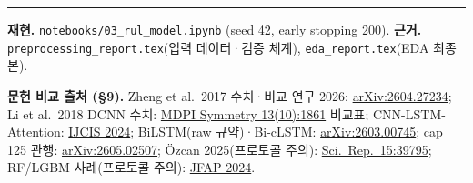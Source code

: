 \documentclass[11pt]{article}
\begin{document}
\vspace{1em}
\hrule
\vspace{0.6em}
\small
\textbf{재현.} \texttt{notebooks/03\_rul\_model.ipynb} (seed 42, early stopping 200).
\quad\textbf{근거.} \texttt{preprocessing\_report.tex}(입력 데이터·검증 체계), \texttt{eda\_report.tex}(EDA 최종본).

\textbf{문헌 비교 출처 (\S9).}
Zheng et al.\ 2017 수치·비교 연구 2026: \href{https://arxiv.org/html/2604.27234v1}{arXiv:2604.27234};
Li et al.\ 2018 DCNN 수치: \href{https://www.mdpi.com/2073-8994/13/10/1861}{MDPI Symmetry 13(10):1861} 비교표;
CNN-LSTM-Attention: \href{https://link.springer.com/article/10.1007/s44196-024-00639-w}{IJCIS 2024};
BiLSTM(raw 규약)·Bi-cLSTM: \href{https://arxiv.org/html/2603.00745}{arXiv:2603.00745};
cap 125 관행: \href{https://arxiv.org/html/2605.02507v1}{arXiv:2605.02507};
Özcan 2025(프로토콜 주의): \href{https://pmc.ncbi.nlm.nih.gov/articles/PMC12615660/}{Sci.\ Rep.\ 15:39795};
RF/LGBM 사례(프로토콜 주의): \href{https://link.springer.com/article/10.1007/s11668-024-01922-w}{JFAP 2024}.
\end{document}
